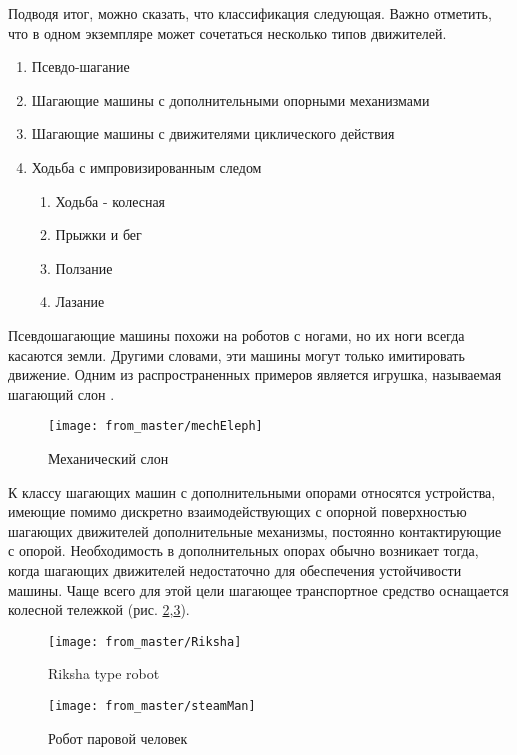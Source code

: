 Подводя итог, можно сказать, что классификация следующая. Важно отметить, что в одном экземпляре может сочетаться несколько типов движителей.
\begin{enumerate}
\item Псевдо-шагание
\item Шагающие машины с дополнительными опорными механизмами
\item Шагающие машины с движителями циклического действия
\item Ходьба с импровизированным следом
\begin{enumerate}
\item Ходьба - колесная
\item Прыжки и бег
\item Ползание
\item Лазание
\end{enumerate}
\end{enumerate}

Псевдошагающие машины похожи на роботов с ногами, но их ноги всегда касаются земли. Другими словами, эти машины могут только имитировать движение. Одним из распространенных примеров является игрушка, называемая шагающий слон .


\begin{figure}[H]
\centering\texttt{[image: from\_master/mechEleph]}
\caption{Механический слон}
\label{fig:mechEleph}
\end{figure}

К классу шагающих машин с дополнительными опорами относятся устройства, имеющие помимо дискретно взаимодействующих с опорной поверхностью шагающих движителей дополнительные механизмы, постоянно контактирующие с опорой. Необходимость в дополнительных опорах обычно возникает тогда, когда шагающих движителей недостаточно для обеспечения устойчивости машины. Чаще всего для этой цели шагающее транспортное средство оснащается колесной тележкой (рис. \ref{fig:Riksha},\ref{fig:steamMan})\cite{Brisk2011, Petr1986}.

\begin{figure}[H]
\centering\texttt{[image: from\_master/Riksha]}
\caption{Riksha type robot}
\label{fig:Riksha}
\end{figure}

\begin{figure}[H]
\centering\texttt{[image: from\_master/steamMan]}
\caption{Робот паровой человек}
\label{fig:steamMan}
\end{figure}

